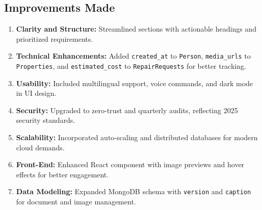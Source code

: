\documentclass[12pt]{article}
\begin{document}
\subsection{Improvements Made}
\begin{enumerate}
    \item \textbf{Clarity and Structure:} Streamlined sections with actionable headings and prioritized requirements.
    \item \textbf{Technical Enhancements:} Added \texttt{created\_at} to \texttt{Person}, \texttt{media\_urls} to \texttt{Properties}, and \texttt{estimated\_cost} to \texttt{RepairRequests} for better tracking.
    \item \textbf{Usability:} Included multilingual support, voice commands, and dark mode in UI design.
    \item \textbf{Security:} Upgraded to zero-trust and quarterly audits, reflecting 2025 security standards.
    \item \textbf{Scalability:} Incorporated auto-scaling and distributed databases for modern cloud demands.
    \item \textbf{Front-End:} Enhanced React component with image previews and hover effects for better engagement.
    \item \textbf{Data Modeling:} Expanded MongoDB schema with \texttt{version} and \texttt{caption} for document and image management.
\end{enumerate}
\end{document}
